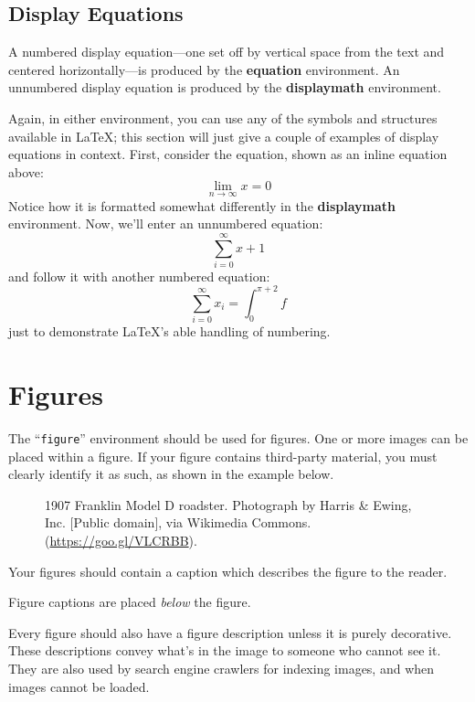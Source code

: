 \documentclass[acmtog]{acmart}
\begin{document}
\subsection{Display Equations}
A numbered display equation---one set off by vertical space from the
text and centered horizontally---is produced by the \textbf{equation}
environment. An unnumbered display equation is produced by the
\textbf{displaymath} environment.

Again, in either environment, you can use any of the symbols and
structures available in \LaTeX\@; this section will just give a couple
of examples of display equations in context.  First, consider the
equation, shown as an inline equation above:
\begin{equation}
  \lim_{n\rightarrow \infty}x=0
\end{equation}
Notice how it is formatted somewhat differently in
the \textbf{displaymath}
environment.  Now, we'll enter an unnumbered equation:
\begin{displaymath}
  \sum_{i=0}^{\infty} x + 1
\end{displaymath}
and follow it with another numbered equation:
\begin{equation}
  \sum_{i=0}^{\infty}x_i=\int_{0}^{\pi+2} f
\end{equation}
just to demonstrate \LaTeX's able handling of numbering.

\section{Figures}

The ``\verb|figure|'' environment should be used for figures. One or
more images can be placed within a figure. If your figure contains
third-party material, you must clearly identify it as such, as shown
in the example below.
\begin{figure}[h]
  \centering
  \caption{1907 Franklin Model D roadster. Photograph by Harris \&
    Ewing, Inc. [Public domain], via Wikimedia
    Commons. (\url{https://goo.gl/VLCRBB}).}
\end{figure}

Your figures should contain a caption which describes the figure to
the reader.

Figure captions are placed {\itshape below} the figure.

Every figure should also have a figure description unless it is purely
decorative. These descriptions convey what’s in the image to someone
who cannot see it. They are also used by search engine crawlers for
indexing images, and when images cannot be loaded.
\end{document}
